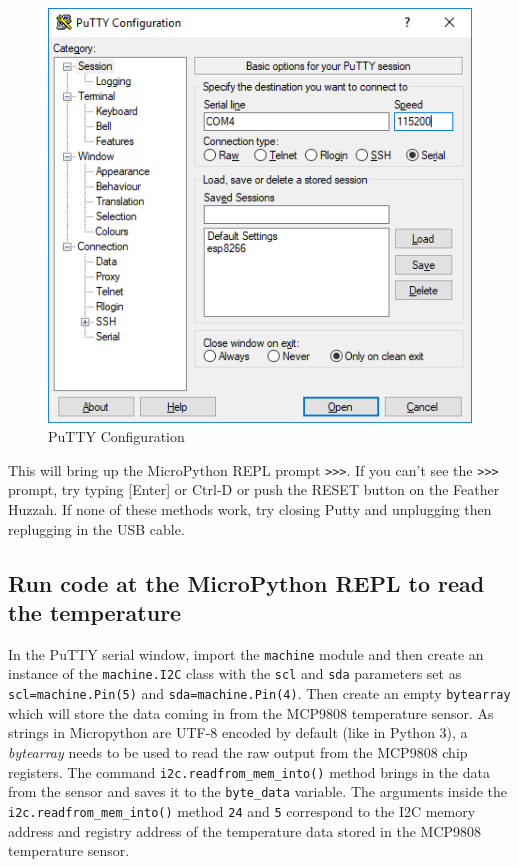 \documentclass{book}
\makeatletter
\def\maxwidth{\ifdim\Gin@nat@width>\linewidth\linewidth
    \else\Gin@nat@width\fi}
\let\Oldincludegraphics\includegraphics
\renewcommand{\includegraphics}[1]{\Oldincludegraphics[width=.8\maxwidth]{#1}}
\makeatother
\begin{document}
\begin{figure}
\centering
\includegraphics{images/putty_config.PNG}
\caption{PuTTY Configuration}
\end{figure}

This will bring up the MicroPython REPL prompt \lstinline!>>>!. If you
can't see the \lstinline!>>>! prompt, try typing {[}Enter{]} or Ctrl-D
or push the RESET button on the Feather Huzzah. If none of these methods
work, try closing Putty and unplugging then replugging in the USB cable.
    




    
        \subsection{Run code at the MicroPython REPL to read the
temperature}\label{run-code-at-the-micropython-repl-to-read-the-temperature}
    




    
        In the PuTTY serial window, import the \lstinline!machine! module and
then create an instance of the \lstinline!machine.I2C! class with the
\lstinline!scl! and \lstinline!sda! parameters set as
\lstinline!scl=machine.Pin(5)! and \lstinline!sda=machine.Pin(4)!. Then
create an empty \lstinline!bytearray! which will store the data coming
in from the MCP9808 temperature sensor. As strings in Micropython are
UTF-8 encoded by default (like in Python 3), a \emph{bytearray} needs to
be used to read the raw output from the MCP9808 chip registers. The
command \lstinline!i2c.readfrom_mem_into()! method brings in the data
from the sensor and saves it to the \lstinline!byte_data! variable. The
arguments inside the \lstinline!i2c.readfrom_mem_into()! method
\lstinline!24! and \lstinline!5! correspond to the I2C memory address
and registry address of the temperature data stored in the MCP9808
temperature sensor.
\end{document}
